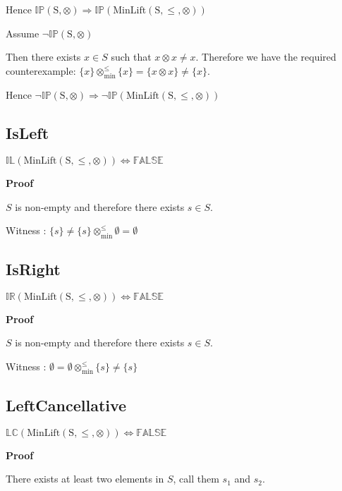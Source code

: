 \documentclass[10pt]{article}
\newcommand{\propname}[1]{{\mathbb{#1}}}
\newcommand{\minlift}{\otimes_{\min}^{\leq}}
\newcommand{\proof}{\vspace{1em} \textbf{Proof} \vspace{1em}}
\newenvironment{ind}[0]{\begin{addmargin}[1em]{0em}\vspace{0.5em}}{\end{addmargin}\vspace{0.5em}}
\begin{document}
Hence $\propname{IP}(\mathrm{S,\otimes}) \Rightarrow \propname{IP}(\mathrm{MinLift(S,\leq,\otimes)})$

\vspace{2em}

Assume $\neg \propname{IP}(\mathrm{S,\otimes})$

\begin{ind}
Then there exists $x \in S$ such that $x \otimes x \neq x$. Therefore we have the required counterexample: $\{x\} \minlift \{x\} = \{x \otimes x\} \neq \{ x \}$.
\end{ind}

Hence $\neg \propname{IP}(\mathrm{S,\otimes}) \Rightarrow \neg \propname{IP}(\mathrm{MinLift(S,\leq,\otimes)})$




\subsection{IsLeft}
$\propname{IL}(\mathrm{MinLift(S,\leq,\otimes)}) \Leftrightarrow \propname{FALSE}$

\proof

$S$ is non-empty and therefore there exists $s \in S$.

\vspace{0.5em}

Witness : $\{s\} \neq \{s\} \minlift \emptyset = \emptyset$



\subsection{IsRight}
$\propname{IR}(\mathrm{MinLift(S,\leq,\otimes)}) \Leftrightarrow \propname{FALSE}$

\proof

$S$ is non-empty and therefore there exists $s \in S$.

\vspace{0.5em}

Witness : $\emptyset = \emptyset \minlift \{s\} \neq \{s\}$



\subsection{LeftCancellative}
$\propname{LC}(\mathrm{MinLift(S,\leq,\otimes)}) \Leftrightarrow \propname{FALSE}$

\proof

There exists at least two elements in $S$, call them $s_1$ and $s_2$.
\end{document}
